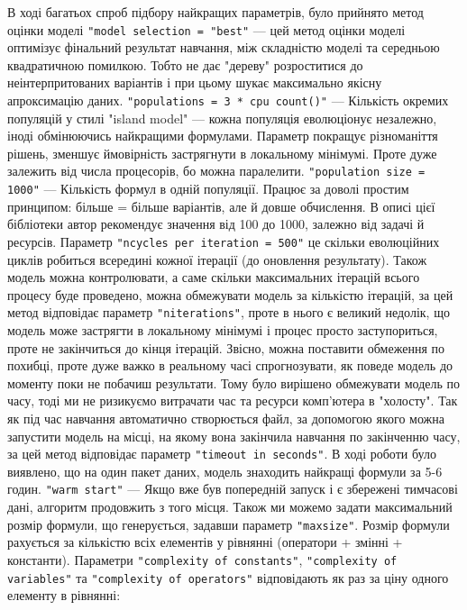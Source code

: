 \documentclass[14pt,a4paper,titlepage,oneside]{book}
\numberwithin{equation}{part}
\begin{document}
    В ході багатьох спроб підбору найкращих параметрів, було прийнято метод оцінки моделі
    \texttt{"model selection = "best"} — цей метод оцінки моделі оптимізує фінальний результат
    навчання, між складністю моделі та середньою квадратичною помилкою. Тобто не  дає "дереву"
    розроститися до неінтерпритованих варіантів і при цьому шукає максимально якісну
    апроксимацію даних. \texttt{"populations = 3 * cpu count()"} — Кількість окремих популяцій у
    стилі "island model" — кожна популяція еволюціонує незалежно, іноді обмінюючись
    найкращими формулами. Параметр покращує різноманіття рішень, зменшує ймовірність
    застрягнути в локальному мінімумі. Проте дуже залежить від числа процесорів, бо можна
    паралелити. \texttt{"population size = 1000"} — Кількість формул в одній популяції. Працює за
    доволі простим принципом: більше = більше варіантів, але й довше обчислення. В описі
    цієї бібліотеки автор рекомендує значення від 100 до 1000, залежно від задачі й
    ресурсів. Параметр \texttt{"ncycles per iteration = 500"} це скільки еволюційних циклів робиться
    всередині кожної ітерації (до оновлення результату). Також модель можна контролювати, а
    саме скільки максимальних ітерацій всього процесу буде проведено, можна обмежувати
    модель за кількістю ітерацій, за цей метод відповідає параметр \texttt{"niterations"}, проте в
    нього є великий недолік, що модель може застрягти в локальному мінімумі і процес просто
    заступориться, проте не закінчиться до кінця ітерацій. Звісно, можна поставити
    обмеження по похибці, проте дуже важко в реальному часі спрогнозувати, як поведе модель
    до моменту поки не побачиш результати. Тому було вирішено обмежувати модель по часу,
    тоді ми не ризикуємо витрачати час та ресурси комп’ютера в "холосту". Так як під час
    навчання автоматично створюється файл, за допомогою якого можна запустити модель на
    місці, на якому вона закінчила навчання по закінченню часу, за цей метод відповідає
    параметр \texttt{"timeout in seconds"}. В ході роботи було виявлено, що на один пакет даних,
    модель знаходить найкращі формули за 5-6 годин. \texttt{"warm start"} — Якщо вже був попередній
    запуск і є збережені тимчасові дані, алгоритм продовжить з того місця. Також ми можемо
    задати максимальний розмір формули, що генерується, задавши параметр \texttt{"maxsize"}. Розмір
    формули рахується за кількістю всіх елементів у рівнянні (оператори + змінні + константи).
    Параметри \texttt{"complexity of constants"}, \texttt{"complexity of variables"} та
    \texttt{"complexity of operators"} відповідають як раз за ціну одного елементу в рівнянні:
\end{document}

